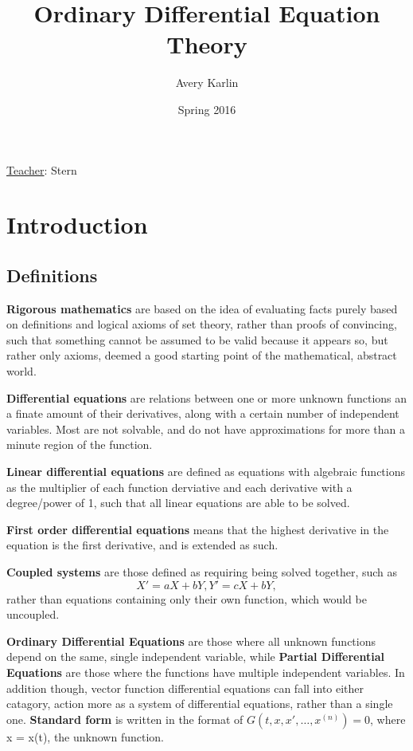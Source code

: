 \documentclass[11 pt, twoside]{article}
\begin{document}
\title{Ordinary Differential Equation Theory}
\author{Avery Karlin}
\date{Spring 2016}
\newcommand{\teacher}{Stern}

\maketitle
\newpage
\hypertarget{content}{\tableofcontents}
\vspace{11pt}
\noindent
\underline{Teacher}: \teacher
\newpage

\section{Introduction}

\subsection{Definitions}
\textbf{Rigorous mathematics} are based on the idea of evaluating facts purely based on definitions and logical axioms of set theory, rather than proofs of convincing, such that something cannot be assumed to be valid because it appears so, but rather only axioms, deemed a good starting point of the mathematical, abstract world.

\textbf{Differential equations} are relations between one or more unknown functions an a finate amount of their derivatives, along with a certain number of independent variables. Most are not solvable, and do not have approximations for more than a minute region of the function.

\textbf{Linear differential equations} are defined as equations with algebraic functions as the multiplier of each function derviative and each derivative with a degree/power of 1, such that all linear equations are able to be solved.

\textbf{First order differential equations} means that the highest derivative in the equation is the first derivative, and is extended as such.

\textbf{Coupled systems} are those defined as requiring being solved together, such as $$X' = aX + bY, Y' = cX + bY,$$ rather than equations containing only their own function, which would be uncoupled.

\textbf{Ordinary Differential Equations} are those where all unknown functions depend on the same, single independent variable, while \textbf{Partial Differential Equations} are those where the functions have multiple independent variables. In addition though, vector function differential equations can fall into either catagory, action more as a system of differential equations, rather than a single one. \textbf{Standard form} is written in the format of $G(t, x, x', \dots, x^{(n)}) = 0$, where x = x(t), the unknown function.
\end{document}
